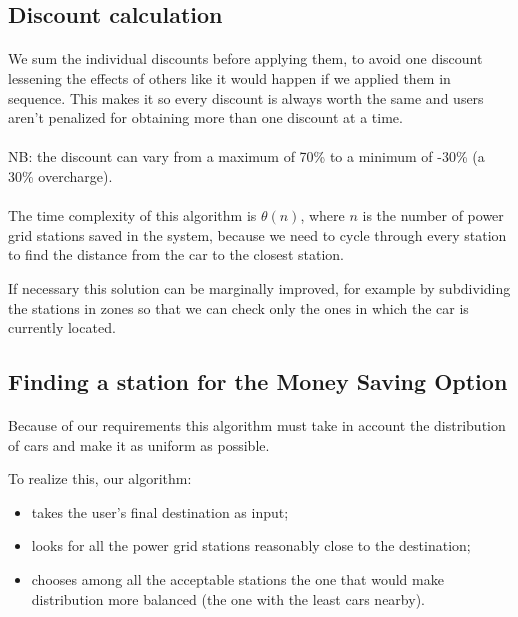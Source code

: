 \documentclass[english]{article}
\begin{document}
\newpage
\subsection{Discount calculation}



\paragraph{}
We sum the individual discounts before applying them, to avoid one discount lessening the effects of others like it would happen if we applied them in sequence. This makes it so every discount is always worth the same and users aren't penalized for obtaining more than one discount at a time.

\paragraph{}
NB: the discount can vary from a maximum of 70\% to a minimum of -30\% (a 30\% overcharge).

\paragraph{}
The time complexity of this algorithm is $\theta(n)$, where $n$ is the number of power grid stations saved in the system, because we need to cycle through every station to find the distance from the car to the closest station.

If necessary this solution can be marginally improved, for example by subdividing the stations in zones so that we can check only the ones in which the car is currently located.

\newpage
\subsection{Finding a station for the Money Saving Option}



\paragraph{}
Because of our requirements this algorithm must take in account the distribution of cars and make it as uniform as possible.

To realize this, our algorithm:
\begin{itemize}
	\item{takes the user's final destination as input;}
	\item{looks for all the power grid stations reasonably close to the destination;}
	\item{chooses among all the acceptable stations the one that would make distribution more balanced (the one with the least cars nearby).}
\end{itemize}
\end{document}
